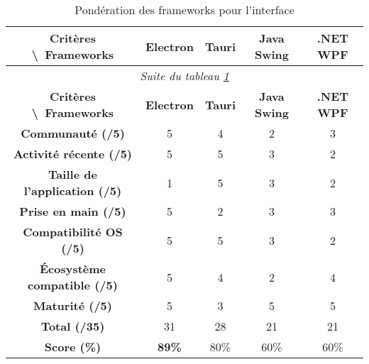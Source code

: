 \begin{longtable}{|c|c|c|c|c|}
\caption{\label{tab:frameworks_scores_color} Pondération des frameworks pour l'interface} \\

\hline
\textbf{Critères \textbackslash\ Frameworks} & \textbf{Electron} & \textbf{Tauri} & \textbf{Java Swing} & \textbf{.NET WPF} \\
\hline
\endfirsthead

\multicolumn{5}{c}{\textit{Suite du tableau \ref{tab:frameworks_scores_color}}} \\
\hline
\textbf{Critères \textbackslash\ Frameworks} & \textbf{Electron} & \textbf{Tauri} & \textbf{Java Swing} & \textbf{.NET WPF} \\
\hline
\endhead

\textbf{Communauté (/5)} & \cellcolor{green!20}5 & \cellcolor{yellow!20}4 & \cellcolor{red!20}2 & \cellcolor{yellow!20}3 \\

\textbf{Activité récente (/5)} & \cellcolor{green!20}5 & \cellcolor{green!20}5 & \cellcolor{yellow!20}3 & \cellcolor{red!20}2 \\

\textbf{Taille de l'application (/5)} & \cellcolor{red!20}1 & \cellcolor{green!20}5 & \cellcolor{yellow!20}3 & \cellcolor{red!20}2 \\

\textbf{Prise en main (/5)} & \cellcolor{green!20}5 & \cellcolor{red!20}2 & \cellcolor{yellow!20}3 & \cellcolor{yellow!20}3 \\

\textbf{Compatibilité OS (/5)} & \cellcolor{green!20}5 & \cellcolor{green!20}5 & \cellcolor{yellow!20}3 & \cellcolor{red!20}2 \\

\textbf{Écosystème compatible (/5)} & \cellcolor{green!20}5 & \cellcolor{yellow!20}4 & \cellcolor{red!20}2 & \cellcolor{yellow!20}4 \\

\textbf{Maturité (/5)} & \cellcolor{green!20}5 & \cellcolor{yellow!20}3 & \cellcolor{green!20}5 & \cellcolor{green!20}5 \\
\hline
\textbf{Total (/35)} & \cellcolor{green!20}31 & \cellcolor{yellow!20}28 & \cellcolor{red!20}21 & \cellcolor{red!20}21 \\
\hline
\textbf{Score (\%)} & \cellcolor{green!20}\textbf{89\%} & \cellcolor{yellow!20}80\% & \cellcolor{red!20}60\% & \cellcolor{red!20}60\% \\
\hline

\end{longtable}

